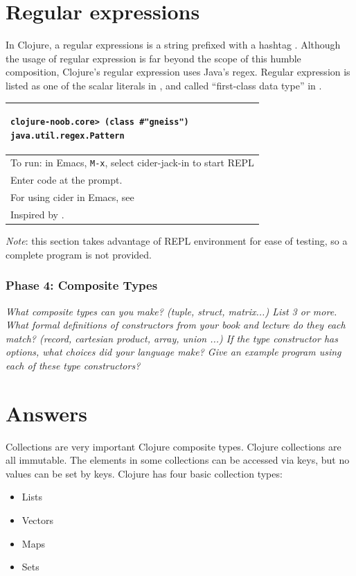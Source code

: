 \documentclass[12pt]{article}
\begin{document}
\newpage
\part{Regular expressions}
In Clojure, a regular expressions is a string prefixed with a hashtag \cite{rathore2011clojure}. Although the usage of regular expression is far beyond the scope of this humble composition, Clojure's regular expression uses Java's regex. Regular expression is listed as one of the scalar literals in \cite{rathore2011clojure}, and called ``first-class data type'' in \cite{fogus2014joy}. 



\begin{tabular}{|p{}|}
\hline
\begin{verbatim}
clojure-noob.core> (class #"gneiss")
java.util.regex.Pattern
\end{verbatim}
\\
\hline
To run: in Emacs, \texttt{M-x}, select cider-jack-in to start REPL\\
Enter code at the prompt.\\
For using cider in Emacs, see \cite{brave2015}\\
\hline
Inspired by \cite{fogus2014joy}.\\
\hline
\end{tabular}

\vspace{20pt}
{\it Note}: this section takes advantage of REPL environment for ease of testing, so a complete program is not provided.

\section{Phase 4: Composite Types}

{\it What composite types can you make? (tuple, struct, matrix...) List 3 or more. What formal definitions of constructors from your book and lecture do they each match? (record, cartesian product, array, union ...) If the type constructor has options, what choices did your language make? Give an example program using each of these type constructors?}

\part{Answers}

Collections are very important Clojure composite types. Clojure collections are all immutable. The elements in some collections can be accessed via keys, but no values can be set by keys. Clojure has four basic collection types:
\begin{itemize} 
\item Lists
\item Vectors
\item Maps
\item Sets
\end{itemize}
\end{document}
